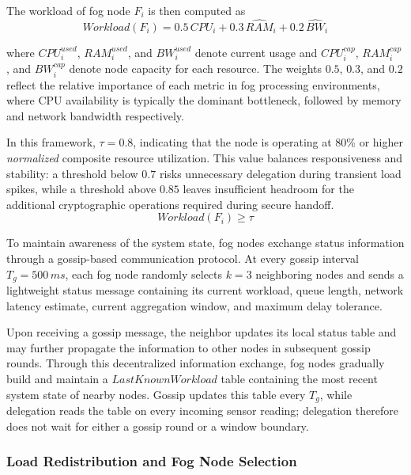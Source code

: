 \documentclass[conference]{IEEEtran}
\begin{document}
    The workload of fog node $F_i$ is then computed as
    \begin{equation}
    Workload(F_i) = 0.5\,\widehat{CPU}_i + 0.3\,\widehat{RAM}_i + 0.2\,\widehat{BW}_i
    \label{eq:workload-definition}
    \end{equation}

    where $CPU_i^{used}$, $RAM_i^{used}$, and $BW_i^{used}$ denote current usage and $CPU_i^{cap}$, $RAM_i^{cap}$, and $BW_i^{cap}$ denote node capacity for each resource. The weights $0.5$, $0.3$, and $0.2$ reflect the relative importance of each metric in fog processing environments, where CPU availability is typically the dominant bottleneck, followed by memory and network bandwidth respectively.

    In this framework, $\tau = 0.8$, indicating that the node is operating at 80\% or higher \emph{normalized} composite resource utilization. This value balances responsiveness and stability: a threshold below $0.7$ risks unnecessary delegation during transient load spikes, while a threshold above $0.85$ leaves insufficient headroom for the additional cryptographic operations required during secure handoff.
    \begin{equation}
    Workload(F_i) \geq \tau
    \end{equation}

    To maintain awareness of the system state, fog nodes exchange status information through a gossip-based communication protocol. At every gossip interval $T_g=500\,ms$, each fog node randomly selects $k=3$ neighboring nodes and sends a lightweight status message containing its current workload, queue length, network latency estimate, current aggregation window, and maximum delay tolerance.

    Upon receiving a gossip message, the neighbor updates its local status table and may further propagate the information to other nodes in subsequent gossip rounds. Through this decentralized information exchange, fog nodes gradually build and maintain a $LastKnownWorkload$ table containing the most recent system state of nearby nodes. Gossip updates this table every $T_g$, while delegation reads the table on every incoming sensor reading; delegation therefore does not wait for either a gossip round or a window boundary.

    \subsubsection{Load Redistribution and Fog Node Selection}
\end{document}
